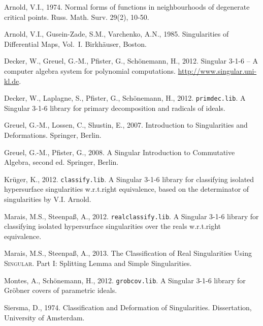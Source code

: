 \documentclass{amsproc}
\theoremstyle{definition}
\newcommand{\Singular}{\textsc{Singular}}
\begin{document}
\begin{thebibliography}{99}

Arnold, V.I., 1974.
Normal forms of functions in neighbourhoods of degenerate critical points.
Russ. Math. Surv. 29(2), 10-50.

Arnold, V.I., Gusein-Zade, S.M., Varchenko, A.N., 1985.
Singularities of Differential Maps, Vol.~I.
Birkh\"auser, Boston.

Decker, W., Greuel, G.-M., Pfister, G., Sch{\"o}nemann, H., 2012.
{\sc Singular} {3-1-6} -- {A} computer algebra system for polynomial
computations.
\url{http://www.singular.uni-kl.de}.

Decker, W., Laplagne, S., Pfister, G., Sch\"onemann, H., 2012.
{\tt primdec.lib}. {A} {\sc Singular} {3-1-6} library for primary decomposition
and radicals of ideals.

Greuel, G.-M., Lossen, C., Shustin, E., 2007.
Introduction to Singularities and Deformations.
Springer, Berlin.

Greuel, G.-M., Pfister, G., 2008.
A Singular Introduction to Commutative Algebra, second ed.
Springer, Berlin.

Kr\"uger, K., 2012.
{\tt classify.lib}. {A} {\sc Singular} {3-1-6} library for classifying isolated
hypersurface singularities w.r.t.\@ right equivalence, based on the
determinator of singularities by V.I. Arnold.

Marais, M.S., Steenpa\ss, A., 2012.
{\tt realclassify.lib}. {A} {\sc Singular} {3-1-6} library for classifying
isolated hypersurface singularities over the reals w.r.t.\@ right equivalence.

Marais, M.S., Steenpa\ss, A., 2013.
The Classification of Real Singularities Using \Singular{}. Part I: Splitting
Lemma and Simple Singularities.

Montes, A., Sch\"onemann, H., 2012.
{\tt grobcov.lib}. {A} {\sc Singular} {3-1-6} library for Gr\"obner covers of
parametric ideals.

Siersma, D., 1974.
Classification and Deformation of Singularities.
Dissertation, University of Amsterdam.

\end{thebibliography}
\end{document}

